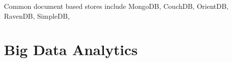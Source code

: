 \documentclass[]{article}
\begin{document}
Common document based stores include MongoDB, CouchDB, OrientDB, RavenDB, SimpleDB, 


\section{Big Data Analytics} \label{sec:big-data-analytics}






\end{document}
